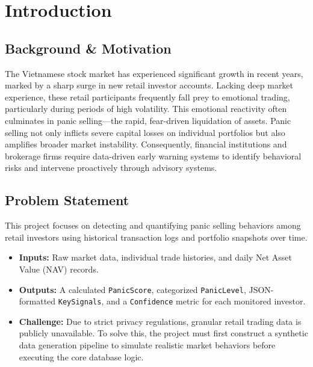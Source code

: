 \section{Introduction}

\subsection{Background \& Motivation}
The Vietnamese stock market has experienced significant growth in recent years, marked by a sharp surge in new retail investor accounts. Lacking deep market experience, these retail participants frequently fall prey to emotional trading, particularly during periods of high volatility. This emotional reactivity often culminates in panic selling—the rapid, fear-driven liquidation of assets. Panic selling not only inflicts severe capital losses on individual portfolios but also amplifies broader market instability. Consequently, financial institutions and brokerage firms require data-driven early warning systems to identify behavioral risks and intervene proactively through advisory systems.

\subsection{Problem Statement}
This project focuses on detecting and quantifying panic selling behaviors among retail investors using historical transaction logs and portfolio snapshots over time. 

\begin{itemize}
    \item \textbf{Inputs:} Raw market data, individual trade histories, and daily Net Asset Value (NAV) records.
    \item \textbf{Outputs:} A calculated \texttt{PanicScore}, categorized \texttt{PanicLevel}, JSON-formatted \texttt{KeySignals}, and a \texttt{Confidence} metric for each monitored investor.
    \item \textbf{Challenge:} Due to strict privacy regulations, granular retail trading data is publicly unavailable. To solve this, the project must first construct a synthetic data generation pipeline to simulate realistic market behaviors before executing the core database logic.
\end{itemize}

